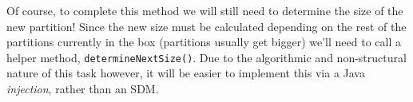 Of course, to complete this method we will still need to determine the size of the new partition! Since the new size must be calculated depending on the
rest of the partitions currently in the box (partitions usually get bigger) we'll need to call a helper method, \texttt{determineNextSize()}. Due to the
algorithmic and non-structural nature of this task however, it will be easier to implement this via a Java \emph{injection}, rather than an SDM.






